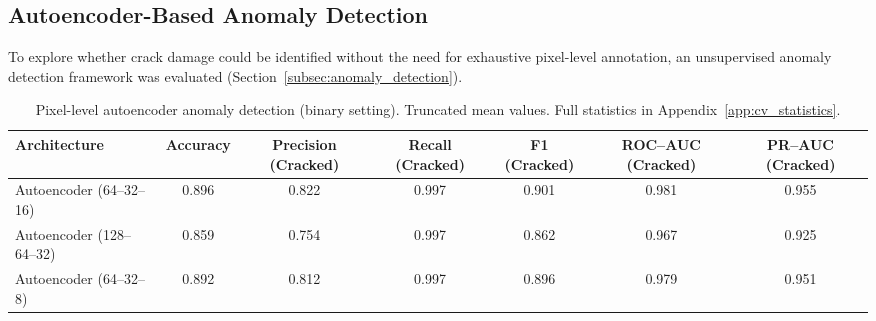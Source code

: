 \begin{landscape}
\thispagestyle{plain}
\section{Autoencoder-Based Anomaly Detection}
\label{sec:anomaly-detection}

\noindent
To explore whether crack damage could be identified without the need for exhaustive pixel-level annotation, an unsupervised anomaly detection framework was evaluated (Section~\ref{subsec:anomaly_detection}).

\begin{table}[!htbp]
    \centering
    \small
    \caption[Autoencoder anomaly detection: binary setting]{Pixel-level autoencoder anomaly detection (binary setting). Truncated mean values. Full statistics in Appendix~\ref{app:cv_statistics}.}
    \label{tab:autoencoder_pixel_results}
    \renewcommand{\arraystretch}{1.2}
    \setlength{\tabcolsep}{4pt}
    \begin{adjustbox}{max width=\linewidth,center}
    \begin{tabular}{@{}lcccccc@{}}
        \toprule
        Architecture & Accuracy & Precision (Cracked) & Recall (Cracked) & F1 (Cracked) & ROC--AUC (Cracked) & PR--AUC (Cracked) \\
        \midrule
        Autoencoder (64--32--16) & 0.896 & 0.822 & 0.997 & 0.901 & 0.981 & 0.955 \\
        Autoencoder (128--64--32) & 0.859 & 0.754 & 0.997 & 0.862 & 0.967 & 0.925 \\
        Autoencoder (64--32--8) & 0.892 & 0.812 & 0.997 & 0.896 & 0.979 & 0.951 \\
        \bottomrule
    \end{tabular}
    \end{adjustbox}
\end{table}

\vspace{-6pt}


\end{landscape}
